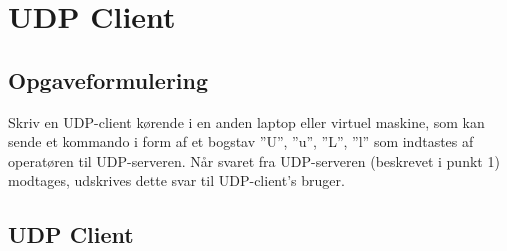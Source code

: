 \chapter{UDP Client}

\section{Opgaveformulering}

Skriv en UDP-client kørende i en anden laptop eller virtuel maskine, som kan sende
et kommando i form af et bogstav ”U”, ”u”, ”L”, ”l” som indtastes af operatøren til
UDP-serveren. Når svaret fra UDP-serveren (beskrevet i punkt 1) modtages,
udskrives dette svar til UDP-client’s bruger. 


\section{UDP Client}